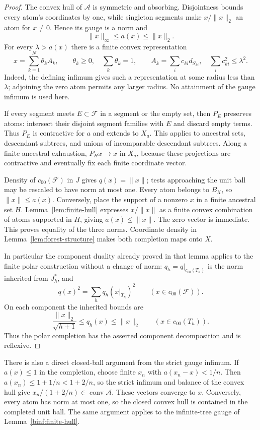 \begin{proof}
The convex hull of $\mathcal A$ is symmetric and absorbing. Disjointness
bounds every atom's coordinates by one, while singleton segments make
$x/\|x\|_2$ an atom for $x\ne0$. Hence its gauge is a norm and
\begin{equation}\label{presentation:gauge-bounds}
 \|x\|_\infty\le a(x)\le\|x\|_2.
\end{equation}
For every $\lambda>a(x)$ there is a finite convex representation
\[
 x=\sum_{k=1}^N\theta_k A_k,\qquad
 \theta_k\ge0,\quad\sum_k\theta_k=1,
 \qquad
 A_k=\sum_i c_{ki}d_{S_{ki}},\quad
 \sum_i c_{ki}^2\le\lambda^2.
\]
Indeed, the defining infimum gives such a representation at some radius
less than $\lambda$; adjoining the zero atom permits any larger radius.
No attainment of the gauge infimum is used here.

If every segment meets $E\subset\mathcal F$ in a segment or the empty
set, then $P_E$ preserves atoms: intersect their disjoint segment
families with $E$ and discard empty terms. Thus $P_E$ is contractive for
$a$ and extends to $X_a$. This applies to ancestral sets, descendant
subtrees, and unions of incomparable descendant subtrees. Along a finite
ancestral exhaustion, $P_Hx\to x$ in $X_a$, because these projections
are contractive and eventually fix each finite coordinate vector.

Density of $c_{00}(\mathcal F)$ in $J$ gives $q(x)=\|x\|$; tests
approaching the unit ball may be rescaled to have norm at most one.
Every atom belongs to $B_X$, so $\|x\|\le a(x)$. Conversely, place the
support of a nonzero $x$ in a finite ancestral set $H$.
Lemma~\ref{lem:finite-hull} expresses $x/\|x\|$ as a finite convex
combination of atoms supported in $H$, giving $a(x)\le\|x\|$.
The zero vector is immediate. This proves equality of the three norms.
Coordinate density in Lemma~\ref{lem:forest-structure} makes both
completion maps onto $X$.

In particular the component duality already proved in that lemma
applies to the finite polar construction without a change of norm:
$q_h=q|_{c_{00}(T_h)}$ is the norm inherited from $J_h^*$, and
\[
 q(x)^2=\sum_h q_h(x|_{T_h})^2
 \qquad(x\in c_{00}(\mathcal F)).
\]
On each component the inherited bounds are
\[
 \frac{\|x\|_2}{\sqrt{h+1}}\le q_h(x)\le\|x\|_2
 \qquad(x\in c_{00}(T_h)).
\]
Thus the polar completion has the asserted component decomposition
and is reflexive.
\end{proof}

\begin{remark}\label{presentation:rescaled-closed-ball}
There is also a direct closed-ball argument from the strict gauge
infimum. If $a(x)\le1$ in the completion, choose finite $x_n$ with
$a(x_n-x)<1/n$. Then $a(x_n)\le1+1/n<1+2/n$, so the strict
infimum and balance of the convex hull give
$x_n/(1+2/n)\in\operatorname{conv}\mathcal A$. These vectors converge
to $x$. Conversely, every atom has norm at most one, so the closed
convex hull is contained in the completed unit ball. The same argument
applies to the infinite-tree gauge of Lemma~\ref{binf:finite-hull}.
\end{remark}


